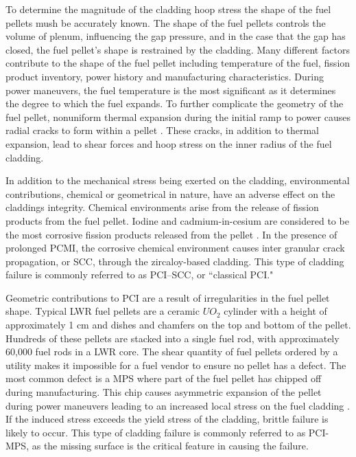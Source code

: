 \documentclass[edeposit,fullpage,11pt]{uiucthesis2009}
\begin{document}
To determine the magnitude of the cladding hoop stress the shape of the fuel pellets mush be accurately known.
The shape of the fuel pellets controls the volume of plenum, influencing the gap pressure, and in the case that the gap has closed, the fuel pellet's shape is restrained by the cladding. 
Many different factors contribute to the shape of the fuel pellet including temperature of the fuel, fission product inventory, power history and manufacturing characteristics.
During power maneuvers, the fuel temperature is the most significant as it determines the degree to which the fuel expands.
To further complicate the geometry of the fuel pellet, nonuniform thermal expansion during the initial ramp to power causes radial cracks to form within a pellet \cite{capps_evaluation_2016}.
These cracks, in addition to thermal expansion, lead to shear forces and hoop stress on the inner radius of the fuel cladding.
  
In addition to the mechanical stress being exerted on the cladding, environmental contributions, chemical or geometrical in nature, have an adverse effect on the claddings integrity.
Chemical environments arise from the release of fission products from the fuel pellet.
Iodine and cadmium-in-cesium are considered to be the most corrosive fission products released from the pellet \cite{capps_evaluation_2016}. 
In the presence of prolonged \gls{PCMI}, the corrosive chemical environment causes inter granular crack propagation, or \gls{SCC}, through the zircaloy-based cladding.
This type of cladding failure is commonly referred to as \gls{PCI}--\gls{SCC}, or ``classical \gls{PCI}."

Geometric contributions to \gls{PCI} are a result of irregularities in the fuel pellet shape.
Typical \gls{LWR} fuel pellets are a ceramic $UO_2$ cylinder with a height of approximately 1 cm and dishes and chamfers on the top and bottom of the pellet.
Hundreds of these pellets are stacked into a single fuel rod, with approximately 60,000 fuel rods in a \gls{LWR} core.
The shear quantity of fuel pellets ordered by a utility makes it impossible for a fuel vendor to ensure no pellet has a defect.
The most common defect is a \gls{MPS} where part of the fuel pellet has chipped off during manufacturing.
This chip causes asymmetric expansion of the pellet during power maneuvers leading to an increased local stress on the fuel cladding \cite{capps_evaluation_2016}. 
If the induced stress exceeds the yield stress of the cladding, brittle failure is likely to occur.
This type of cladding failure is commonly referred to as \gls{PCI}-\gls{MPS}, as the missing surface is the critical feature in causing the failure.
\end{document}
